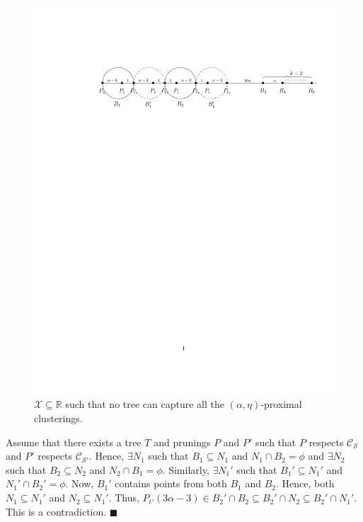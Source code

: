 \documentclass[orivec]{llncs}
\newcommand{\mc}{\mathcal}
\renewcommand{\qed}{\hfill\ensuremath{\blacksquare}}
\begin{document}
\begin{figure}[!t]
\begin{center}
\includegraphics[trim={35mm 235mm 20mm 20mm},clip,width=\textwidth]{figures/lbdFig2}
\end{center}
\vspace{-1cm}
\caption{$\mc X \subseteq \mathbb{R}$ such that no tree can capture all the $(\alpha, \eta)$-proximal clusterings.}
\label{fig:noalgalphacp}
\end{figure}

Assume that there exists a tree $T$ and prunings $P$ and $P'$ such that $P$ respects $\mc C_{\mc S}$ and $P'$ respects $\mc C_{\mc S'}$. Hence,  $\exists N_1$ such that $B_1 \subseteq N_1$ and $N_1 \cap B_2 = \phi$ and $\exists N_2$ such that $B_2 \subseteq N_2$ and $N_2 \cap B_1 = \phi$. Similarly, $\exists N_1'$ such that $B_1' \subseteq N_1'$ and $N_1' \cap B_2' = \phi$. Now, $B_1'$ contains points from both $B_1$ and $B_2$. Hence, both $N_1 \subseteq N_1'$ and $N_2 \subseteq N_1'$. Thus, $P_{t'}(3\alpha-3)\in B_2'\cap B_2 \subseteq B_2' \cap N_2 \subseteq B_2' \cap N_1'$. This is a contradiction.
\qed\\
\end{document}
